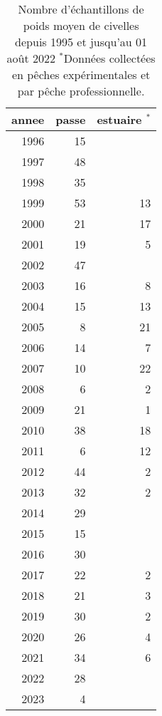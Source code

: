 \begin{table}[ht]
\centering
\begin{tabular}{rrr}
  \hline
annee & passe & estuaire $^*$ \\ 
  \hline
1996 & 15 &  \\ 
  1997 & 48 &  \\ 
  1998 & 35 &  \\ 
  1999 & 53 & 13 \\ 
  2000 & 21 & 17 \\ 
  2001 & 19 & 5 \\ 
  2002 & 47 &  \\ 
  2003 & 16 & 8 \\ 
  2004 & 15 & 13 \\ 
  2005 & 8 & 21 \\ 
  2006 & 14 & 7 \\ 
  2007 & 10 & 22 \\ 
  2008 & 6 & 2 \\ 
  2009 & 21 & 1 \\ 
  2010 & 38 & 18 \\ 
  2011 & 6 & 12 \\ 
  2012 & 44 & 2 \\ 
  2013 & 32 & 2 \\ 
  2014 & 29 &  \\ 
  2015 & 15 &  \\ 
  2016 & 30 &  \\ 
  2017 & 22 & 2 \\ 
  2018 & 21 & 3 \\ 
  2019 & 30 & 2 \\ 
  2020 & 26 & 4 \\ 
  2021 & 34 & 6 \\ 
  2022 & 28 &  \\ 
  2023 & 4 &  \\ 
   \hline
\end{tabular}
\caption{Nombre d'échantillons de poids moyen de civelles depuis 1995 et jusqu'au 01 août 2022 $^*$Données collectées en pêches expérimentales et par pêche professionnelle.} 
\label{tnpm}
\end{table}
